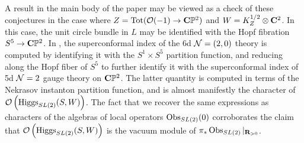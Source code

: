 A result in the main body of the paper may be viewed as a check of these conjectures in the case where $Z = \operatorname{Tot}(\mathcal O(-1)\to \mathbf{C}\mathbb P^{2})$ and $W = K^{1/2}_{Z}\otimes \mathbf{C}^{2}$. In this case, the unit circle bundle in $L$ may be identified with the Hopf fibration $S^{5}\to \mathbf{C}\mathbb P^{2}$. In \cite{Kim:2013nva}, the superconformal index of the 6d $\mathcal N=(2,0)$ theory is computed by identifying it with the $S^{1}\times S^{5}$ partition function, and reducing along the Hopf fiber of $S^{5}$ to further identify it with the superconformal index of 5d $\mathcal N=2$ gauge theory on $\mathbf{C}\mathbb P^{2}$. The latter quantity is computed in terms of the Nekrasov instanton partition function, and is almost manifestly the character of $\mathcal O \left ( \operatorname{Higgs} _{SL(2)}(S, W)\right)$. The fact that we recover the same expressions as characters of the algebras of local operators $\operatorname{Obs}_{SL(2)}(0)$ corroborates the claim that $ \mathcal O \left ( \operatorname{Higgs} _{SL(2)}(S, W)\right)$ is the vacuum module of $\pi_{*}\operatorname{Obs}_{SL(2)}|_{\mathbf{R}_{>0}}$.





%
